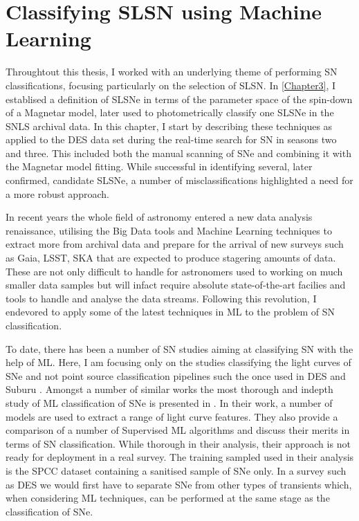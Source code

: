 \chapter{Classifying SLSN using Machine Learning}
\label{Chapter5}

Throughtout this thesis, I worked with an underlying theme of performing SN classifications, focusing particularly on the selection of SLSN. In \cref{Chapter3}, I establised a definition of SLSNe in terms of the parameter space of the spin-down of a Magnetar model, later used to photometrically classify one SLSNe in the SNLS archival data. In this chapter, I start by describing these techniques as applied to the DES data set during the real-time search for SN in seasons two and three. This included both the manual scanning of SNe and combining it with the Magnetar model fitting. While successful in identifying several, later confirmed, candidate SLSNe, a number of misclassifications highlighted a need for a more robust approach.

In recent years the whole field of astronomy entered a new data analysis renaissance, utilising the Big Data tools and Machine Learning techniques to extract more from archival data and prepare for the arrival of new surveys such as Gaia, LSST, SKA that are expected to produce stagering amounts of data. These are not only difficult to handle for astronomers used to working on much smaller data samples but will infact require absolute state-of-the-art facilies and tools to handle and analyse the data streams. Following this revolution, I endevored to apply some of the latest techniques in ML to the problem of SN classification.

To date, there has been a number of SN studies aiming at classifying SN with the help of ML. Here, I am focusing only on the studies classifying the light curves of SNe and not point source classification pipelines such the once used in DES \citep{Goldstein2015} and Suburu \citep{Morii2016}. Amongst a number of similar works \citep{Karpenka2012,Moller2016,Charnock2016} the most thorough and indepth study of ML classification of SNe is presented in \citet{Lochner2016}. In their work, a number of models are used to extract a range of light curve features. They also provide a comparison of a number of Supervised ML algorithms and discuss their merits in terms of SN classification. While thorough in their analysis, their approach is not ready for deployment in a real survey. The training sampled used in their analysis is the SPCC dataset containing a sanitised sample of SNe only. In a survey such as DES we would first have to separate SNe from other types of transients which, when considering ML techniques, can be performed at the same stage as the classification of SNe.

